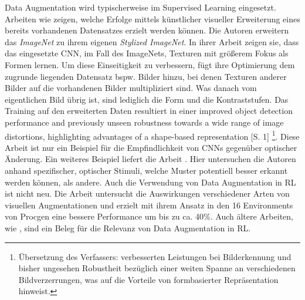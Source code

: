 Data Augmentation wird typischerweise im Supervised Learning eingesetzt. Arbeiten wie \cite{geirhos2018imagenet} zeigen, welche Erfolge mittels künstlicher visueller Erweiterung eines bereits vorhandenen Datensatzes erzielt werden können. Die Autoren erweitern das \emph{ImageNet} \cite{imagenet_cvpr09} zu ihrem eigenen \emph{Stylized ImageNet}. In ihrer Arbeit zeigen sie, dass das eingesetzte CNN, im Fall des ImageNets, Texturen mit größerem Fokus als Formen lernen. Um diese Einseitigkeit zu verbessern, fügt ihre Optimierung dem zugrunde liegenden Datensatz bspw. Bilder hinzu, bei denen Texturen anderer Bilder auf die vorhandenen Bilder multipliziert sind. Was danach vom eigentlichen Bild übrig ist, sind lediglich die Form und die Kontraststufen. Das Training auf den erweiterten Daten resultiert in einer \dq  [...] improved object detection performance and previously unseen robustness towards a wide range of image distortions, highlighting advantages of a shape-based representation\dq{}  \cite{geirhos2018imagenet}[S. 1] \footnote{\label{foot:absch_RL_mdp_ubersetzung}Übersetzung des Verfassers: verbesserten Leistungen bei Bilderkennung und bisher ungesehen Robustheit bezüglich einer weiten Spanne an verschiedenen Bildverzerrungen, was auf die Vorteile von formbasierter Repräsentation hinweist.}. Diese Arbeit ist nur ein Beispiel für die Empfindlichkeit von CNNs gegenüber optischer Änderung. Ein weiteres Beispiel liefert die Arbeit \cite{reith2019convolutional}. Hier untersuchen die Autoren anhand spezifischer, optischer Stimuli, welche Muster potentiell besser erkannt werden können, als andere. 
Auch die Verwendung von Data Augmentation in RL ist nicht neu. Die Arbeit \cite{raileanu2020automatic} untersucht die Auswirkungen verschiedener Arten von visuellen Augmentationen und erzielt mit ihrem Ansatz in den 16 Environments von Procgen eine bessere Performance um bis zu ca. 40\%.  Auch ältere Arbeiten, wie \cite{zhang2018natural}, sind ein Beleg für die Relevanz von Data Augmentation in RL. 

